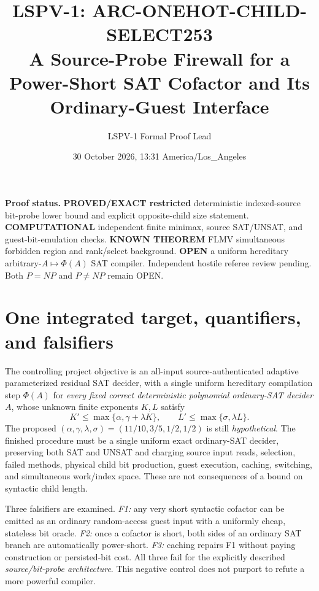 \documentclass[10pt]{article}
\title{LSPV-1: ARC-ONEHOT-CHILD-SELECT253\\
A Source-Probe Firewall for a Power-Short SAT Cofactor and Its Ordinary-Guest Interface}
\author{LSPV-1 Formal Proof Lead}
\date{30 October 2026, 13:31 America/Los\_Angeles}
\begin{document}
\sloppy\maketitle
\noindent\textbf{Proof status.} \textbf{PROVED/EXACT restricted} deterministic indexed-source bit-probe lower bound and explicit opposite-child size statement. \textbf{COMPUTATIONAL} independent finite minimax, source SAT/UNSAT, and guest-bit-emulation checks. \textbf{KNOWN THEOREM} FLMV simultaneous forbidden region and rank/select background. \textbf{OPEN} a uniform hereditary arbitrary-$A\mapsto\Phi(A)$ SAT compiler. Independent hostile referee review pending. Both $P=NP$ and $P\ne NP$ remain OPEN.

\section{One integrated target, quantifiers, and falsifiers}
The controlling project objective is an all-input source-authenticated adaptive parameterized residual SAT decider, with a single uniform hereditary compilation step $\Phi(A)$ for \emph{every fixed correct deterministic polynomial ordinary-SAT decider} $A$, whose unknown finite exponents $K,L$ satisfy
\[
K'\le\max\{\alpha,\gamma+\lambda K\},\qquad
L'\le\max\{\sigma,\lambda L\}.
\tag{1}
\]
The proposed $(\alpha,\gamma,\lambda,\sigma)=(11/10,3/5,1/2,1/2)$ is still \emph{hypothetical}. The finished procedure must be a single uniform exact ordinary-SAT decider, preserving both SAT and UNSAT and charging source input reads, selection, failed methods, physical child bit production, guest execution, caching, switching, and simultaneous work/index space. These are not consequences of a bound on syntactic child length.

Three falsifiers are examined. \emph{F1:} any very short syntactic cofactor can be emitted as an ordinary random-access guest input with a uniformly cheap, stateless bit oracle. \emph{F2:} once a cofactor is short, both sides of an ordinary SAT branch are automatically power-short. \emph{F3:} caching repairs F1 without paying construction or persisted-bit cost. All three fail for the explicitly described \emph{source/bit-probe architecture}. This negative control does not purport to refute a more powerful compiler.
\end{document}
